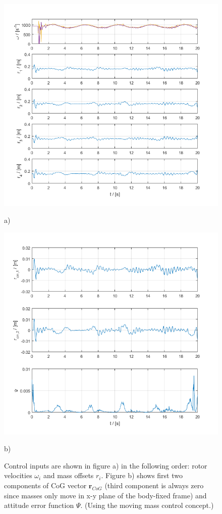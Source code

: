 \begin{figure}
	\centering
	\begin{minipage}{0.5\columnwidth}
		\centering
		\includegraphics[width=\columnwidth]{./pictures/mmc_traj_rotorVel_massOff.png}
		\caption*{a)}
		\label{fig:rotorVel_massOff}
	\end{minipage}%
	\begin{minipage}{0.5\columnwidth}
		\centering
		\includegraphics[width=\columnwidth]{./pictures/mmc_traj_rCm_attErr.png}
		\caption*{b)}
		\label{fig:rCm_attErr}
	\end{minipage}
	\caption{Control inputs are shown in figure a) in the following order: rotor velocities $\omega_i$ and mass offsets $r_i$. Figure b) shows first two components of CoG vector $\textbf{r}_{CoG}$ (third component is always zero since masses only move in x-y plane of the body-fixed frame) and attitude error function $\Psi$. (Using the moving mass control concept.)}
\end{figure}

